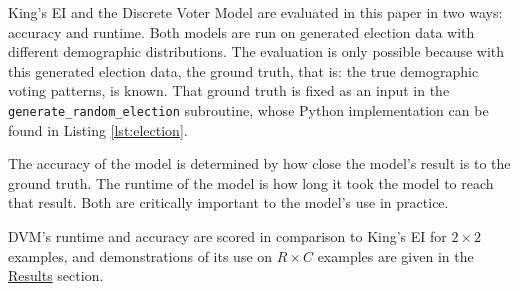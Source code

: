 King's EI and the Discrete Voter Model are evaluated in this paper in two ways: accuracy and runtime. Both models are run on generated election data with different demographic distributions. The evaluation is only possible because with this generated election data, the ground truth, that is: the true demographic voting patterns, is known. That ground truth is fixed as an input in the \texttt{generate\_random\_election} subroutine, whose Python implementation can be found in Listing \ref{lst:election}.

The accuracy of the model is determined by how close the model's result is to the ground truth. The runtime of the model is how long it took the model to reach that result. Both are critically important to the model's use in practice.

DVM's runtime and accuracy are scored in comparison to King's EI for $2 \times 2$ examples, and demonstrations of its use on $R \times C$ examples are given in the \hyperref[sec:results]{Results} section.
